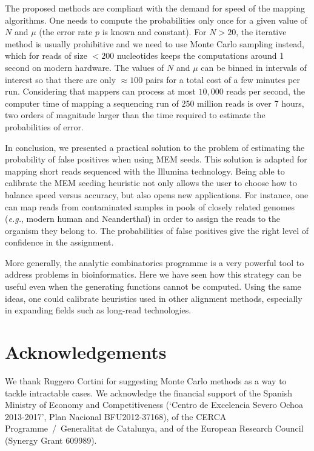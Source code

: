 \documentclass{article}
\begin{document}
The proposed methods are compliant with the demand for speed of the
mapping algorithms. One needs to compute the probabilities only once for a
given value of $N$ and $\mu$ (the error rate $p$ is known and constant).
For $N > 20$, the iterative method is usually prohibitive and we need to
use Monte Carlo sampling instead, which for reads of size $< 200$
nucleotides keeps the computations around 1 second on modern hardware. The
values of $N$ and $\mu$ can be binned in intervals of interest so that
there are only $\approx 100$ pairs for a total cost of a few minutes per
run. Considering that mappers can process at most $10,000$ reads per
second, the computer time of mapping a sequencing run of 250 million reads
is over 7 hours, two orders of magnitude larger than the time required to
estimate the probabilities of error.

In conclusion, we presented a practical solution to the problem of
estimating the probability of false positives when using MEM seeds. This
solution is adapted for mapping short reads sequenced with the Illumina
technology. Being able to calibrate the MEM seeding heuristic not only
allows the user to choose how to balance speed versus accuracy, but also
opens new applications. For instance, one can map reads from contaminated
samples in pools of closely related genomes (\textit{e.g.}, modern human
and Neanderthal) in order to assign the reads to the organism they belong
to. The probabilities of false positives give the right level of
confidence in the assignment.

More generally, the analytic combinatorics programme is a very powerful
tool to address problems in bioinformatics. Here we have seen how this
strategy can be useful even when the generating functions cannot be
computed. Using the same ideas, one could calibrate heuristics used in
other alignment methods, especially in expanding fields such as long-read
technologies.


\section*{Acknowledgements}

We thank Ruggero Cortini for suggesting Monte Carlo methods as a way to
tackle intractable cases. We acknowledge the financial support of the
Spanish Ministry of Economy and Competitiveness (‘Centro de Excelencia
Severo Ochoa 2013-2017’, Plan Nacional BFU2012-37168), of the CERCA
Programme~/~Generalitat de Catalunya, and of the European Research Council
(Synergy Grant 609989).






\end{document}
